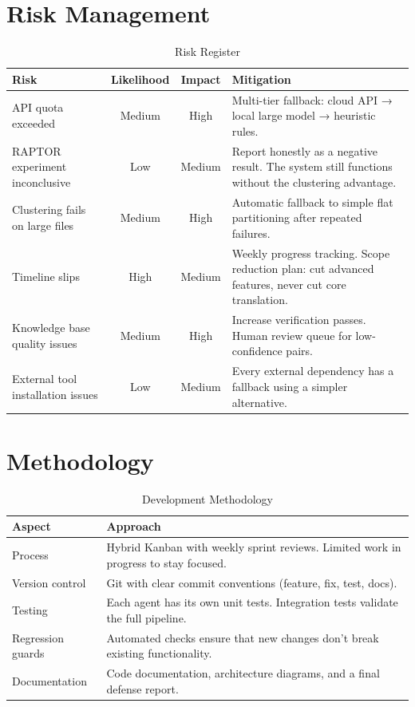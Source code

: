 \documentclass[11pt,a4paper]{article}
\begin{document}
\section{Risk Management}

\begin{table}[H]
\centering
\caption{Risk Register}
\renewcommand{\arraystretch}{1.3}
\small
\begin{tabularx}{\textwidth}{@{} L{3.2cm} c c X @{}}
\toprule
\textbf{Risk} & \textbf{Likelihood} & \textbf{Impact} & \textbf{Mitigation} \\
\midrule
API quota exceeded & Medium & High & Multi-tier fallback: cloud API → local large model → heuristic rules. \\
RAPTOR experiment inconclusive & Low & Medium & Report honestly as a negative result. The system still functions without the clustering advantage. \\
Clustering fails on large files & Medium & High & Automatic fallback to simple flat partitioning after repeated failures. \\
Timeline slips & High & Medium & Weekly progress tracking. Scope reduction plan: cut advanced features, never cut core translation. \\
Knowledge base quality issues & Medium & High & Increase verification passes. Human review queue for low-confidence pairs. \\
External tool installation issues & Low & Medium & Every external dependency has a fallback using a simpler alternative. \\
\bottomrule
\end{tabularx}
\end{table}


\section{Methodology}

\begin{table}[H]
\centering
\caption{Development Methodology}
\renewcommand{\arraystretch}{1.3}
\begin{tabularx}{\textwidth}{@{} l X @{}}
\toprule
\textbf{Aspect} & \textbf{Approach} \\
\midrule
Process & Hybrid Kanban with weekly sprint reviews. Limited work in progress to stay focused. \\
Version control & Git with clear commit conventions (feature, fix, test, docs). \\
Testing & Each agent has its own unit tests. Integration tests validate the full pipeline. \\
Regression guards & Automated checks ensure that new changes don't break existing functionality. \\
Documentation & Code documentation, architecture diagrams, and a final defense report. \\
\bottomrule
\end{tabularx}
\end{table}
\end{document}
